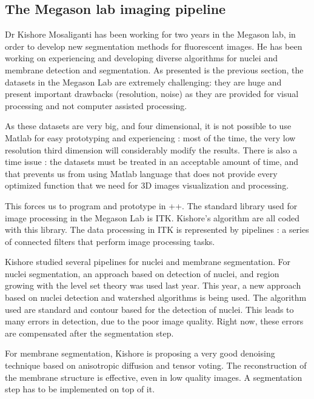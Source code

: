 



\subsection{The Megason lab imaging pipeline}

Dr Kishore Mosaliganti has been working for two years in the Megason lab, in order to develop new segmentation methods for fluorescent images.
He has been working on experiencing and developing diverse algorithms for nuclei and membrane detection and segmentation.
As presented is the previous section, the datasets in the Megason Lab are extremely challenging:
they are huge and present important drawbacks (resolution, noise) as they are provided for visual processing and not computer assisted processing.

As these datasets are very big, and four dimensional, it is not possible to use Matlab for easy prototyping and experiencing : 
most of the time, the very low resolution third dimension will considerably modify the results.
There is also a time issue : the datasets must be treated in an acceptable amount of time,
and that prevents us from using Matlab language that does not provide every optimized function that we need for 3D images visualization and processing.

This forces us to program and prototype in {\C++}. The standard library used for image processing in the Megason Lab is ITK. Kishore's algorithm are all coded with this library.
The data processing in ITK is represented by pipelines : a series of connected filters that perform image processing tasks.


Kishore studied several pipelines for nuclei and membrane segmentation.
For nuclei segmentation, an approach based on detection of nuclei, and region growing with the level set theory was used last year.
This year, a new approach based on nuclei detection and watershed algorithms is being used.
The algorithm used are standard and contour based for the detection of nuclei.
This leads to many errors in detection, due to the poor image quality. Right now, these errors are compensated after the segmentation step.

For membrane segmentation, Kishore is proposing a very good denoising technique based on anisotropic diffusion and tensor voting.
The reconstruction of the membrane structure is effective, even in low quality images. A segmentation step has to be implemented on top of it.

